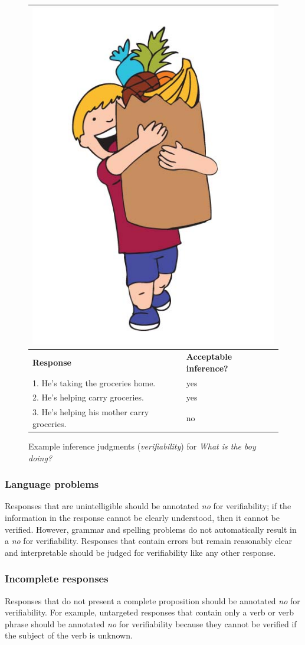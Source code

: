 \documentclass[12pt,notitlepage]{article}
\begin{document}
\begin{figure}[h]
\begin{center}
\begin{tabular}{|p{}|p{}|}
\hline
\multicolumn{2}{|c|}{\includegraphics[width=0.4\columnwidth,trim=0 0 0 -3]{../figures/I06.jpg}}\\
\hline
\textbf{Response} & \textbf{Acceptable inference?}\\
\hline
1. He's taking the groceries home. & yes \\
\hline
2. He's helping carry groceries. & yes \\
\hline
3. He's helping his mother carry groceries. & no \\
\hline
\end{tabular}{}
\end{center}
\caption{Example inference judgments (\textit{verifiability}) for \textit{What is the boy doing?}}
\label{fig:carry-groceries}
\end{figure}

\subsubsection{Language problems} Responses that are unintelligible should be annotated \textit{no} for verifiability; if the information in the response cannot be clearly understood, then it cannot be verified. However, grammar and spelling problems do not automatically result in a \textit{no} for verifiability. Responses that contain errors but remain reasonably clear and interpretable should be judged for verifiability like any other response.

\subsubsection{Incomplete responses} Responses that do not present a complete proposition should be annotated \textit{no} for verifiability. For example, untargeted responses that contain only a verb or verb phrase should be annotated \textit{no} for verifiability because they cannot be verified if the subject of the verb is unknown.
\end{document}
